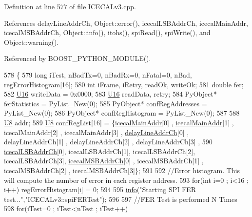 Definition at line 577 of file I\+C\+E\+C\+A\+Lv3.\+cpp.



References delay\+Line\+Addr\+Ch, Object\+::error(), icecal\+L\+S\+B\+Addr\+Ch, icecal\+Main\+Addr, icecal\+M\+S\+B\+Addr\+Ch, Object\+::info(), itohs(), spi\+Read(), spi\+Write(), and Object\+::warning().



Referenced by B\+O\+O\+S\+T\+\_\+\+P\+Y\+T\+H\+O\+N\+\_\+\+M\+O\+D\+U\+L\+E().


\begin{DoxyCode}
578 \{
579     \textcolor{keywordtype}{long} iTest, nBadTx=0, nBadRx=0, nFatal=0, nBad, regErrorHistogram[16];
580     \textcolor{keywordtype}{int} iFrame, iRetry, readOk, writeOk;
581     \textcolor{keywordtype}{double} fer;
582     \hyperlink{ICECALv3_8h_adf928e51a60dba0df29d615401cc55a8}{U16} writeData = 0x0000;
583     \hyperlink{ICECALv3_8h_adf928e51a60dba0df29d615401cc55a8}{U16} readData, retry;
584     PyObject* ferStatistics         = PyList\_New(0); 
585     PyObject* confRegAddresses  = PyList\_New(0);
586     PyObject* confRegHistogram  = PyList\_New(0);
587 
588     \hyperlink{ICECALv3_8h_a3cb25ca6f51f003950f9625ff05536fc}{U8}  addr;
589     \hyperlink{ICECALv3_8h_a3cb25ca6f51f003950f9625ff05536fc}{U8}  confRegList[16] = \{\hyperlink{ICECALv3_8h_a9c22ae782814495416dc2b803df326c1}{icecalMainAddr}[0] , \hyperlink{ICECALv3_8h_a9c22ae782814495416dc2b803df326c1}{icecalMainAddr}[1] , 
      icecalMainAddr[2] , icecalMainAddr[3] , \hyperlink{ICECALv3_8h_a848408b773702d268053cb49d205e097}{delayLineAddrCh}[0] , delayLineAddrCh[1] , delayLineAddrCh[2] , 
      delayLineAddrCh[3] ,
590                                                  \hyperlink{ICECALv3_8h_abd124f50fa794b9b0aded801fabf5322}{icecalLSBAddrCh}[0], icecalLSBAddrCh[1], 
      icecalLSBAddrCh[2], icecalLSBAddrCh[3], \hyperlink{ICECALv3_8h_afba64a649cc9314882fd49b62b99d6e7}{icecalMSBAddrCh}[0] , icecalMSBAddrCh[1] , 
      icecalMSBAddrCh[2] , icecalMSBAddrCh[3]\};
591 
592     \textcolor{comment}{//Error histogram. This will compute the number of error in each register address.}
593     \textcolor{keywordflow}{for}(\textcolor{keywordtype}{int} i=0 ; i<16 ; i++) regErrorHistogram[i] = 0;
594 
595     \hyperlink{classObject_a644fd329ea4cb85f54fa6846484b84a8}{info}(\textcolor{stringliteral}{"Starting SPI FER test..."},\textcolor{stringliteral}{"ICECALv3::spiFERTest"});
596 
597     \textcolor{comment}{//FER Test is performed N Times}
598     \textcolor{keywordflow}{for}(iTest=0 ; iTest<nTest ; iTest++)

\end{DoxyCode}
